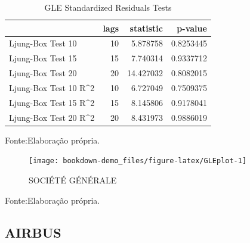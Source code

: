 \documentclass[
  12pt,
  a4paper,
  openany]{book}
\begin{document}
\begin{table}[!h]

\caption{\label{tab:unnamed-chunk-38}GLE Standardized Residuals Tests}
\centering
\begin{tabular}[t]{lrrr}
\toprule
  & lags & statistic & p-value\\
\midrule
Ljung-Box Test 10 & 10 & 5.878758 & 0.8253445\\
Ljung-Box Test 15 & 15 & 7.740314 & 0.9337712\\
Ljung-Box Test 20 & 20 & 14.427032 & 0.8082015\\
Ljung-Box Test 10 R\textasciicircum{}2 & 10 & 6.727049 & 0.7509375\\
Ljung-Box Test 15 R\textasciicircum{}2 & 15 & 8.145806 & 0.9178041\\
\addlinespace
Ljung-Box Test 20 R\textasciicircum{}2 & 20 & 8.431973 & 0.9886019\\
\bottomrule
\end{tabular}
\end{table}
\FloatBarrier
\centering

Fonte:Elaboração própria.

\justifying
\bigskip
\begin{figure}

{\centering \texttt{[image: bookdown-demo\_files/figure-latex/GLEplot-1]} 

}

\caption{SOCIÉTÉ GÉNÉRALE}\label{fig:GLEplot}
\end{figure}
\FloatBarrier
\centering

Fonte:Elaboração própria.

\justifying
\bigskip

\hypertarget{airbus}{%
\subsection{AIRBUS}\label{airbus}}
\end{document}
